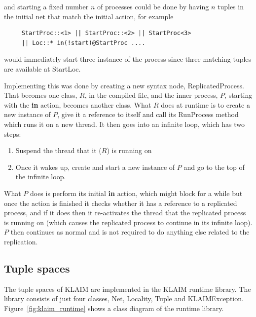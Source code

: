  and starting a fixed number $n$ of processes could be done by having $n$ 
  tuples in the initial net that match the initial action, for example

		\begin{verbatim}
     StartProc::<1> || StartProc::<2> || StartProc<3>
     || Loc::* in(!start)@StartProc ....
		\end{verbatim}
	
	would immediately start three instance of the process since three matching 
	tuples are available at \textsf{StartLoc}.

	Implementing this was done by creating a new syntax node, 
	\textsf{ReplicatedProcess}. That becomes one class, $R$, in the compiled 
	file, and the inner process, $P$, starting with the \textbf{in} action, 
	becomes another class. What $R$ does at runtime is to create a new instance 
	of $P$, give it a reference to itself and call its \textsf{RunProcess} method
	which runs it on a new thread. It then goes into an infinite loop, which has 
	two steps:
	
	\begin{enumerate}
		\item Suspend the thread that it ($R$) is running on
		\item Once it wakes up, create and start a new instance of $P$ and go to 
		the top of the infinite loop.
	\end{enumerate}
	
	What $P$ does is perform its initial \textbf{in} action, which might block 
	for a while but once the action is finished it checks whether it has a 
	reference to a replicated process, and if it does then it re-activates the 
	thread that the replicated process is running on (which causes the 
	replicated process to continue in its infinite loop). $P$ then continues as 
	normal and is not required to do anything else related to the replication.
	
\subsection{Tuple spaces}

	The tuple spaces of KLAIM are implemented in the KLAIM runtime library. The 
	library consists of just four classes, \textsf{Net}, \textsf{Locality}, 
	\textsf{Tuple} and \textsf{KLAIMException}. Figure~\ref{fig:klaim_runtime} 
	shows a class diagram of the runtime library.

